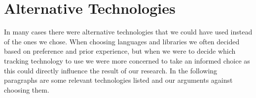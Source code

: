 \documentclass[../Main/thesis.tex]{subfiles}
\begin{document}





\section{Alternative Technologies}
In many cases there were alternative technologies that we could have used instead of the ones we chose.
When choosing languages and libraries we often decided based on preference and prior experience, but when we were to decide which tracking technology to use we were more concerned to take an informed choice as this could directly influence the result of our research.
In the following paragraphs are some relevant technologies listed and our arguments against choosing them.
\end{document}
